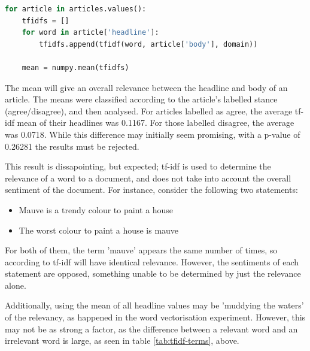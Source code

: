 \begin{lstlisting}[language=Python]
for article in articles.values():
    tfidfs = []
    for word in article['headline']:
        tfidfs.append(tfidf(word, article['body'], domain))

    mean = numpy.mean(tfidfs)
\end{lstlisting}

The mean will give an overall relevance between the headline and body of an article. The means were classified according to the article's labelled stance (agree/disagree), and then analysed. For articles labelled as agree, the average tf-idf mean of their headlines was 0.1167. For those labelled disagree, the average was 0.0718. While this difference may initially seem promising, with a p-value of 0.26281 the results must be rejected.

This result is dissapointing, but expected; tf-idf is used to determine the relevance of a word to a document, and does not take into account the overall sentiment of the document. For instance, consider the following two statements:

\begin{itemize}
	\item Mauve is a trendy colour to paint a house
	\item The worst colour to paint a house is mauve
\end{itemize}

For both of them, the term 'mauve' appears the same number of times, so according to tf-idf will have identical relevance. However, the sentiments of each statement are opposed, something unable to be determined by just the relevance alone. 

Additionally, using the mean of all headline values may be 'muddying the waters' of the relevancy, as happened in the word vectorisation experiment. However, this may not be as strong a factor, as the difference between a relevant word and an irrelevant word is large, as seen in table \ref{tab:tfidf-terms}, above.

